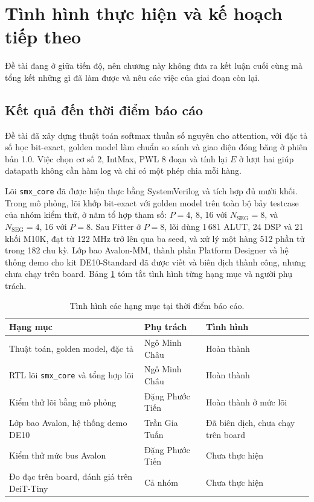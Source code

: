 \section{Tình hình thực hiện và kế hoạch tiếp theo}

Đề tài đang ở giữa tiến độ, nên chương này không đưa ra kết luận cuối cùng mà tổng kết những gì đã làm được và nêu các việc của giai đoạn còn lại.

\subsection{Kết quả đến thời điểm báo cáo}

Đề tài đã xây dựng thuật toán softmax thuần số nguyên cho attention, với đặc tả số học bit-exact, golden model làm chuẩn so sánh và giao diện đóng băng ở phiên bản 1.0. Việc chọn cơ số 2, IntMax, PWL 8 đoạn và tính lại $E$ ở lượt hai giúp datapath không cần hàm log và chỉ có một phép chia mỗi hàng.

Lõi \texttt{smx\_core} đã được hiện thực bằng SystemVerilog và tích hợp đủ mười khối. Trong mô phỏng, lõi khớp bit-exact với golden model trên toàn bộ bảy testcase của nhóm kiểm thử, ở năm tổ hợp tham số: $P = 4$, 8, 16 với $N_{\text{SEG}} = 8$, và $N_{\text{SEG}} = 4$, 16 với $P = 8$. Sau Fitter ở $P = 8$, lõi dùng 1\,681 ALUT, 24 DSP và 21 khối M10K, đạt từ 122 MHz trở lên qua ba seed, và xử lý một hàng 512 phần tử trong 182 chu kỳ. Lớp bao Avalon-MM, thành phần Platform Designer và hệ thống demo cho kit DE10-Standard đã được viết và biên dịch thành công, nhưng chưa chạy trên board. Bảng \ref{tab:status} tóm tắt tình hình từng hạng mục và người phụ trách.

\begin{table}[htbp]
\centering
\small
\begin{tabular}{p{6.4cm}ll}
\toprule
Hạng mục & Phụ trách & Tình hình \\
\midrule
Thuật toán, golden model, đặc tả & Ngô Minh Châu & Hoàn thành \\
RTL lõi \texttt{smx\_core} và tổng hợp lõi & Ngô Minh Châu & Hoàn thành \\
Kiểm thử lõi bằng mô phỏng & Đặng Phước Tiến & Hoàn thành ở mức lõi \\
Lớp bao Avalon, hệ thống demo DE10 & Trần Gia Tuấn & Đã biên dịch, chưa chạy trên board \\
Kiểm thử mức bus Avalon & Đặng Phước Tiến & Chưa thực hiện \\
Đo đạc trên board, đánh giá trên DeiT-Tiny & Cả nhóm & Chưa thực hiện \\
\bottomrule
\end{tabular}
\caption{Tình hình các hạng mục tại thời điểm báo cáo.}
\label{tab:status}
\end{table}

